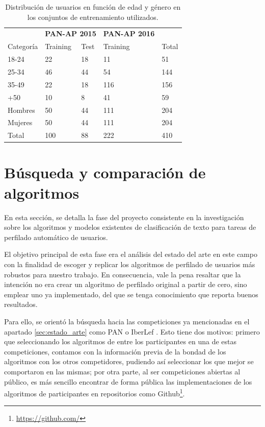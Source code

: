    \begin{table}[hp!]
    \centering
    \begin{tabular}{|l|ll|l|l|}
        \rowcolor{udcpink!25}
        \hhline{~|---|~}
        \multicolumn{1}{c|}{\cellcolor{white}} & \multicolumn{2}{c|}{\textbf{PAN-AP 2015}} & \textbf{PAN-AP 2016} & \multicolumn{1}{c}{\cellcolor{white}}\\ \hhline{-----|}
        Categoría & Training & Test & Training & Total\\ \hline
        18-24 & 22 & 18 & 11 & 51\\
        25-34 & 46 & 44 & 54 & 144\\
        35-49 & 22 & 18 & 116 & 156\\
        +50 & 10 & 8 & 41 & 59\\ \hline
        Hombres & 50 & 44 & 111 & 204\\
        Mujeres & 50 & 44 & 111 & 204\\ \hline
        Total & 100 & 88 & 222 & 410\\ \hline  
    \end{tabular}%
    \caption{Distribución de usuarios en función de edad y género en los conjuntos de entrenamiento utilizados.}
    \label{tab:datasets_edad}
\end{table}

\section{Búsqueda y comparación de algoritmos}

En esta sección, se detalla la fase del proyecto consistente en 
 la investigación sobre los algoritmos y modelos existentes de clasificación de texto para tareas de perfilado automático de usuarios.
 
 El objetivo principal de esta fase era el análisis del estado del arte en este campo con la finalidad de escoger y replicar los algoritmos de perfilado de usuarios más robustos para nuestro trabajo. En consecuencia, vale la pena resaltar que la intención no era crear un algoritmo de perfilado original a partir de cero, sino emplear uno ya implementado, del que se tenga conocimiento que reporta buenos resultados.
 
 Para ello, se orientó la búsqueda hacia las competiciones ya mencionadas en el apartado \ref{sec:estado_arte} como PAN \citep{pan:2013} o IberLef \citep{iberlef2022}. Esto tiene dos motivos: primero que seleccionando los algoritmos de entre los participantes en una de estas competiciones, contamos con la información previa de la bondad de los algoritmos con los otros competidores, pudiendo así seleccionar los que mejor se comportaron en las mismas; por otra parte, al ser competiciones abiertas al público, es más sencillo encontrar de forma pública las implementaciones de los algoritmos de participantes en repositorios como Github\footnote{\url{https://github.com/}}.
 
